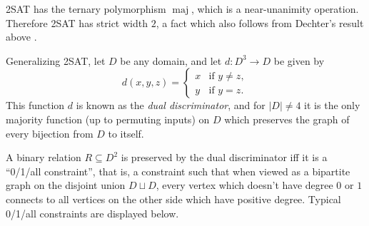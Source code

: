 \documentclass[letterpaper,11pt]{article}
\DeclareMathOperator{\maj}{maj}
\begin{document}
\begin{ex} 2SAT has the ternary polymorphism $\maj$, which is a near-unanimity operation. Therefore 2SAT has strict width $2$, a fact which also follows from Dechter's result above \cite{dechter}.
\end{ex}

\begin{ex}\label{ex-dual-discriminator} Generalizing 2SAT, let $D$ be any domain, and let $d : D^3 \rightarrow D$ be given by
\[
d(x,y,z) = \begin{cases}x & \text{if } y \ne z,\\ y & \text{if } y = z.\end{cases}
\]
This function $d$ is known as the \emph{dual discriminator}, and for $|D| \ne 4$ it is the only majority function (up to permuting inputs) on $D$ which preserves the graph of every bijection from $D$ to itself.

A binary relation $R \subseteq D^2$ is preserved by the dual discriminator iff it is a ``0/1/all constraint'', that is, a constraint such that when viewed as a bipartite graph on the disjoint union $D \sqcup D$, every vertex which doesn't have degree $0$ or $1$ connects to all vertices on the other side which have positive degree. Typical 0/1/all constraints are displayed below.


\end{ex}
\end{document}
